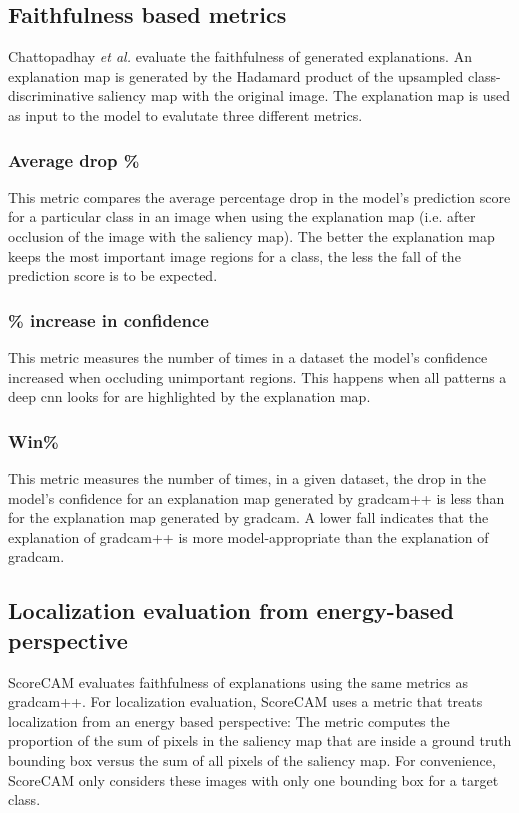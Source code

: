 \subsection{Faithfulness based metrics}
Chattopadhay \textit{et al.} \cite{chattopadhay2018grad} evaluate the faithfulness of generated explanations. An explanation map is generated by the Hadamard product \cite{million2007hadamard} of the upsampled class-discriminative saliency map with the original image. The explanation map is used as input to the model to evalutate three different metrics.

\subsubsection{Average drop \%}
This metric compares the average percentage drop in the model's prediction score for a particular class in an image when using the explanation map (i.e. after occlusion of the image with the saliency map). The better the explanation map keeps the most important image regions for a class, the less the fall of the prediction score is to be expected.

\subsubsection{\% increase in confidence}
This metric measures the number of times in a dataset the model's confidence increased when occluding unimportant regions. This happens when all patterns a deep \acrshort{cnn} looks for are highlighted by the explanation map.

\subsubsection{Win\%}
This metric measures the number of times, in a given dataset, the drop in the model's confidence for an explanation map generated by \acrshort{gradcam}++ is less than for the explanation map generated by \acrshort{gradcam}. A lower fall indicates that the explanation of \acrshort{gradcam}++ is more model-appropriate than the explanation of \acrshort{gradcam}.

\subsection{Localization evaluation from energy-based perspective}
ScoreCAM evaluates faithfulness of explanations using the same metrics as \acrshort{gradcam}++. For localization evaluation, ScoreCAM uses a metric that treats localization from an energy based perspective: The metric computes the proportion of the sum of pixels in the saliency map that are inside a ground truth bounding box versus the sum of all pixels of the saliency map. For convenience, ScoreCAM only considers these images with only one bounding box for a target class.

